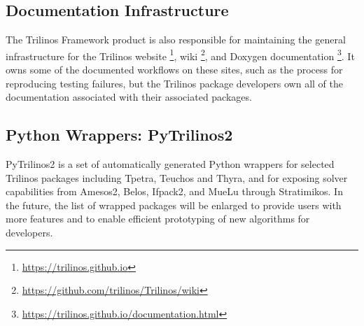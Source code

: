 \subsection{Documentation Infrastructure}

The Trilinos Framework product is also responsible for maintaining the general infrastructure for the Trilinos website \footnote{\url{https://trilinos.github.io}}, wiki \footnote{\url{https://github.com/trilinos/Trilinos/wiki}}, and Doxygen documentation \footnote{\url{https://trilinos.github.io/documentation.html}}. It owns some of the documented workflows on these sites, such as the process for reproducing testing failures, but the Trilinos package developers own all of the documentation associated with their associated packages.


\subsection{Python Wrappers: PyTrilinos2}

PyTrilinos2 is a set of automatically generated Python wrappers for selected Trilinos packages including Tpetra, Teuchos and Thyra, and for exposing solver capabilities from Amesos2, Belos, Ifpack2, and MueLu through Stratimikos. In the future, the list of wrapped packages will be enlarged to provide users with more features and to enable efficient prototyping of new algorithms for developers.

